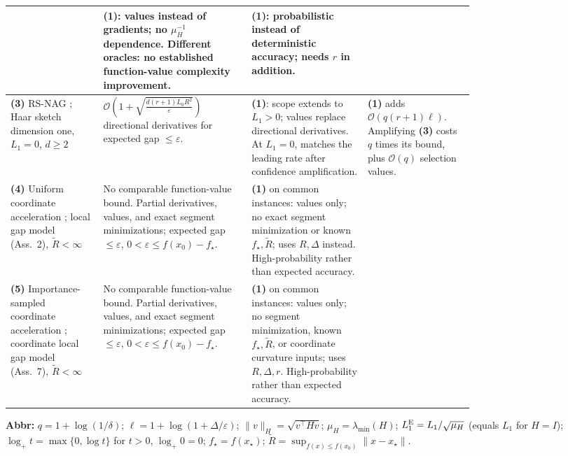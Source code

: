 \begin{table}[tp]
\begin{threeparttable}
\begin{tabularx}{\linewidth}{@{}>{\raggedright\arraybackslash}p{0.20\linewidth}>{\raggedright\arraybackslash}p{0.32\linewidth}>{\raggedright\arraybackslash}p{0.25\linewidth}>{\raggedright\arraybackslash}X@{}}
& \textbf{(1)}: values instead of gradients; no $\mu_H^{-1}$ dependence. Different oracles: no established function-value complexity improvement.
& \textbf{(1)}: probabilistic instead of deterministic accuracy; needs $r$ in addition. \\
\midrule
\textbf{(3)} RS-NAG \citep[Thm.~3.3, Prop.~5.2]{zomgsOmiya2026v1}; Haar sketch dimension one, $L_1=0$, $d\ge2$
& $\mathcal{O}\!\left(1+\sqrt{\frac{d(r+1)L_0R^2}{\varepsilon}}\right)$ directional derivatives for expected gap $\le\varepsilon$.
& \textbf{(1)}: scope extends to $L_1>0$; values replace directional derivatives. At $L_1=0$, matches the leading rate after confidence amplification.
& \textbf{(1)} adds $\mathcal{O}(q(r+1)\ell)$. Amplifying \textbf{(3)} costs $q$ times its bound, plus $\mathcal{O}(q)$ selection values. \\
\midrule
\textbf{(4)} Uniform coordinate acceleration \citep[Thm.~6]{zomgsLobanov2026v1}; local gap model (Ass.~2), $\widetilde R<\infty$
& No comparable function-value bound. Partial derivatives, values, and exact segment minimizations; expected gap $\le\varepsilon$, $0<\varepsilon\le f(x_0)-f_\star$.
& \textbf{(1)} on common instances: values only; no exact segment minimization or known $f_\star,\widetilde R$; uses $R,\Delta$ instead. High-probability rather than expected accuracy.
& \\
\midrule
\textbf{(5)} Importance-sampled coordinate acceleration \citep[Thm.~8]{zomgsLobanov2026v1}; coordinate local gap model (Ass.~7), $\widetilde R<\infty$
& No comparable function-value bound. Partial derivatives, values, and exact segment minimizations; expected gap $\le\varepsilon$, $0<\varepsilon\le f(x_0)-f_\star$.
& \textbf{(1)} on common instances: values only; no segment minimization, known $f_\star,\widetilde R$, or coordinate curvature inputs; uses $R,\Delta,r$. High-probability rather than expected accuracy.
& \\
\bottomrule
\end{tabularx}
\begin{tablenotes}[flushleft]\footnotesize
\item[] \textbf{Abbr:} $q=1+\log(1/\delta)$; $\ell=1+\log(1+\Delta/\varepsilon)$; $\|v\|_H=\sqrt{v^\top Hv}$; $\mu_H=\lambda_{\min}(H)$; $L_1^{\rm E}=L_1/\sqrt{\mu_H}$ (equals $L_1$ for $H=I$); $\log_+ t=\max\{0,\log t\}$ for $t>0$, $\log_+0=0$; $f_\star=f(x_\star)$; $\widetilde R=\sup_{f(x)\le f(x_0)}\|x-x_\star\|$.
\end{tablenotes}
\end{threeparttable}
\end{table}
\clearpage
